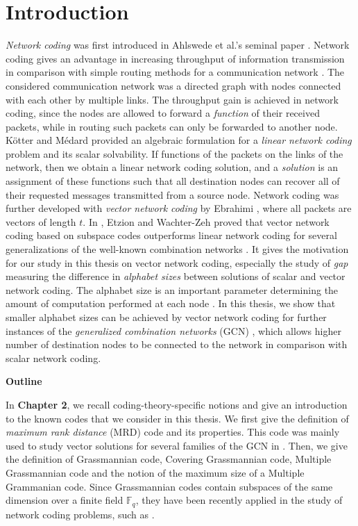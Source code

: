 \chapter{Introduction} \label{chap:introduction}

\textit{Network coding} was first introduced in Ahlswede et al.'s
seminal paper \cite{Ahlswede:2000}. Network coding gives an advantage
in increasing throughput of information transmission in comparison
with simple routing methods for a communication network \cite{Li:2003,Ho:2003}.
The considered communication network was a directed graph with nodes
connected with each other by multiple links. The throughput gain is
achieved in network coding, since the nodes are allowed to forward
a \textit{function} of their received packets, while in routing such
packets can only be forwarded to another node. K\"otter and M\'edard
provided an algebraic formulation for a \textit{linear network coding}
problem and its scalar solvability. If functions of the packets on
the links of the network, then we obtain a linear network coding solution,
and a \textit{solution} is an assignment of these functions such that
all destination nodes can recover all of their requested messages
transmitted from a source node. Network coding was further developed
with \textit{vector network coding} by Ebrahimi \cite{Ebrahimi:2011},
where all packets are vectors of length $t$. In \cite{Wachter-Zeh:2018},
Etzion and Wachter-Zeh proved that vector network coding based on
subspace codes outperforms linear network coding for several generalizations
of the well-known combination networks \cite{Riis:2006}. It gives
the motivation for our study in this thesis on vector network coding,
especially the study of \textit{gap} measuring the difference in \textit{alphabet
sizes} between solutions of scalar and vector network coding. The
alphabet size is an important parameter determining the amount of
computation performed at each node \cite{Wachter-Zeh:2018}. In this
thesis, we show that smaller alphabet sizes can be achieved by vector
network coding for further instances of the \textit{generalized combination
networks} (GCN) \cite{Wachter-Zeh:2018}, which allows higher number
of destination nodes to be connected to the network in comparison
with scalar network coding.

\textbf{Outline}

In \textbf{Chapter 2}, we recall coding-theory-specific notions and
give an introduction to the known codes that we consider in this thesis.
We first give the definition of \textit{maximum rank distance} (MRD)
code and its properties. This code was mainly used to study vector
solutions for several families of the GCN in \cite{Wachter-Zeh:2018}.
Then, we give the definition of Grassmannian code, Covering Grassmannian
code, Multiple Grassmannian code and the notion of the maximum size
of a Multiple Grammanian code. Since Grassmannian codes contain subspaces
of the same dimension over a finite field $\ensuremath{\mathbb{F}}_{q}$,
they have been recently applied in the study of network coding problems,
such as \cite{Etzion:2016,Etzion:2018,Wachter-Zeh:2018,Zhang:2019}.

